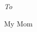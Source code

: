 \cleardoublepage
\thispagestyle{empty}
\vspace*{0.5\textheight}
\begin{center}
\textit{To}

My Mom
\end{center}
\newpage